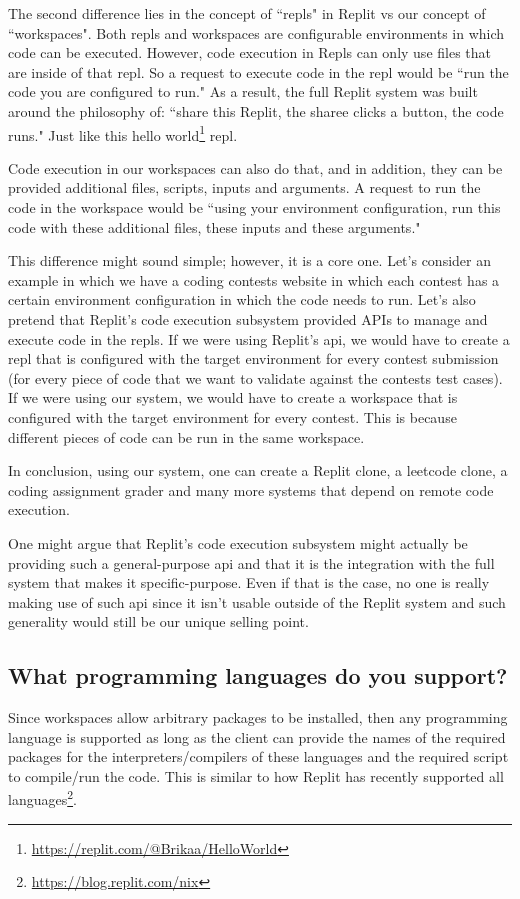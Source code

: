 \documentclass[11pt,a4paper]{article}
\begin{document}
The second difference lies in the concept of ``repls" in Replit vs our concept of ``workspaces".
Both repls and workspaces are configurable environments in which code can be executed.
However, code execution in Repls can only use files that are inside of that repl.
So a request to execute code in the repl would be ``run the code you are configured to run."
As a result, the full Replit system was built around the philosophy of:
``share this Replit, the sharee clicks a button, the code runs."
Just like this hello world\footnote{\url{https://replit.com/@Brikaa/HelloWorld}} repl.

Code execution in our workspaces can also do that, and in addition,
they can be provided additional files, scripts, inputs and arguments.
A request to run the code in the workspace would be
``using your environment configuration, run this code with these additional files, these inputs and these arguments."

This difference might sound simple; however, it is a core one.
Let's consider an example in which we have a coding contests website
in which each contest has a certain environment configuration in which the code needs to run.
Let's also pretend that Replit's code execution subsystem provided APIs to manage and execute code in the repls.
If we were using Replit's api, we would have to create a repl that is configured with the target environment
for every contest submission (for every piece of code that we want to validate against the contests test cases).
If we were using our system, we would have to create a workspace that is configured with the target environment
for every contest.
This is because different pieces of code can be run in the same workspace.

In conclusion, using our system, one can create a Replit clone, a leetcode clone, a coding assignment grader
and many more systems that depend on remote code execution.

One might argue that Replit's code execution subsystem might actually be providing such a general-purpose api
and that it is the integration with the full system that makes it specific-purpose.
Even if that is the case, no one is really making use of such api since it isn't usable outside of the Replit system
and such generality would still be our unique selling point.

\subsection{What programming languages do you support?}
Since workspaces allow arbitrary packages to be installed,
then any programming language is supported as long as the client can provide the names of the required packages
for the interpreters/compilers of these languages and the required script to compile/run the code.
This is similar to how Replit has recently supported all languages\footnote{\url{https://blog.replit.com/nix}}.
\end{document}
